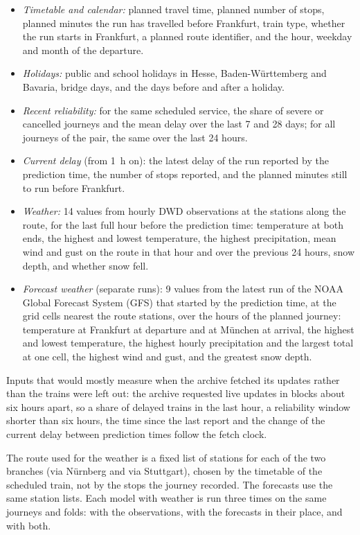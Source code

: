 \documentclass[conference]{IEEEtran}
\begin{document}
\begin{itemize}
\item \emph{Timetable and calendar:} planned travel time, planned number of stops, planned minutes
the run has travelled before Frankfurt, train type, whether the run starts in Frankfurt, a planned
route identifier, and the hour, weekday and month of the departure.
\item \emph{Holidays:} public and school holidays in Hesse, Baden-W\"urttemberg and Bavaria, bridge
days, and the days before and after a holiday.
\item \emph{Recent reliability:} for the same scheduled service, the share of severe or cancelled
journeys and the mean delay over the last 7 and 28 days; for all journeys of the pair, the same over
the last 24 hours.
\item \emph{Current delay} (from 1~h on): the latest delay of the run reported by the prediction
time, the number of stops reported, and the planned minutes still to run before Frankfurt.
\item \emph{Weather:} 14 values from hourly DWD observations at the stations along the route, for
the last full hour before the prediction time: temperature at both ends, the highest and lowest
temperature, the highest precipitation, mean wind and gust on the route in that hour and over the
previous 24 hours, snow depth, and whether snow fell.
\item \emph{Forecast weather} (separate runs): 9 values from the latest run of the NOAA Global
Forecast System (GFS) that started by the prediction time, at the grid cells nearest the route
stations, over the hours of the planned journey: temperature at Frankfurt at departure and at
M\"unchen at arrival, the highest and lowest temperature, the highest hourly precipitation and the
largest total at one cell, the highest wind and gust, and the greatest snow depth.
\end{itemize}

Inputs that would mostly measure when the archive fetched its updates rather than the trains were
left out: the archive requested live updates in blocks about six hours apart, so a share of
delayed trains in the last hour, a reliability window shorter than six hours, the time since the
last report and the change of the current delay between prediction times follow the fetch clock.

The route used for the weather is a fixed list of stations for each of the two branches (via
N\"urnberg and via Stuttgart), chosen by the timetable of the scheduled train, not by the stops the
journey recorded. The forecasts use the same station lists. Each model with weather is run three times on
the same journeys and folds: with the observations, with the forecasts in their place, and with
both.
\end{document}
